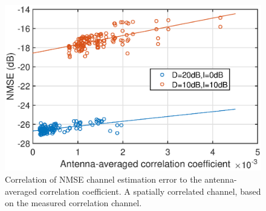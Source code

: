 \begin{figure}[t!]
	\centering
	\includegraphics[width=1.0\linewidth]{figures/NMSE_correlation_measured_collocated.eps}
	\caption{Correlation of NMSE channel estimation error to the antenna-averaged correlation coefficient. A spatially correlated channel, based on
the measured correlation channel.}
	\label{fig:channel_correlation_measured}
\end{figure}




